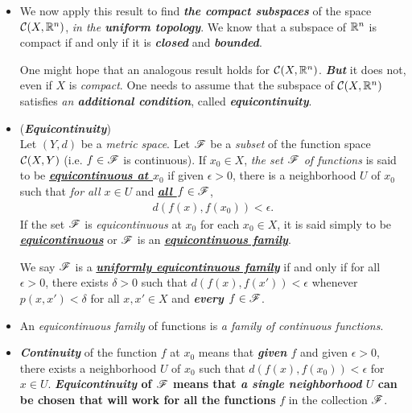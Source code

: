 \documentclass[11pt]{article}
\begin{document}
\begin{itemize}
\item \begin{remark}
We now apply this result to find \emph{\textbf{the compact subspaces}} of the space ${\mathcal C}(X, {\mathbb R}^n)$, \emph{in the \textbf{uniform topology}}. We know that a subspace of ${\mathbb R}^n$ is compact if and only if it is \emph{\textbf{closed}} and \emph{\textbf{bounded}}. 

One might hope that an analogous result holds for ${\mathcal C}(X, {\mathbb R}^n)$. \emph{\textbf{But}} it does not, even if $X$ is \emph{compact}. One needs to assume that the subspace of ${\mathcal C}(X, {\mathbb R}^n)$ satisfies \emph{an \textbf{additional condition}}, called \emph{\textbf{equicontinuity}}. 
\end{remark}

\item \begin{definition}  (\emph{\textbf{Equicontinuity}}) \citep{reed1980methods, munkres2000topology} \\
Let $(Y, d)$ be a \emph{metric space}. Let ${\mathscr F}$ be a \emph{subset} of the function space ${\mathcal C}(X, Y)$ (i.e. $f \in {\mathscr F}$ is continuous). If $x_0 \in X$, \emph{the set ${\mathscr F}$ of functions} is said to be \underline{\emph{\textbf{equicontinuous at $x_0$}}} if given $\epsilon >0$, there is a neighborhood $U$ of $x_0$ such that \emph{for all $x \in U$} and \underline{\emph{\textbf{all $f \in {\mathscr F}$}}},
\begin{align*}
d(f(x), f(x_0)) < \epsilon.
\end{align*}
If the set ${\mathscr F}$ is \emph{equicontinuous} at $x_0$ for each $x_0 \in X$, it is said simply to be \underline{\emph{\textbf{equicontinuous}}} or ${\mathscr F}$ is an \underline{\emph{\textbf{equicontinuous family}}}.

We say ${\mathscr F}$ is a \underline{\emph{\textbf{uniformly equicontinuous family}}} if and only if for all $\epsilon >0$, there exists $\delta > 0$ such that $d(f(x), f(x')) < \epsilon$ whenever $p(x, x') < \delta$ for all $x, x' \in X$ and \emph{\textbf{every $f \in {\mathscr F}$}}.
\end{definition}

\item \begin{remark}
An \emph{equicontinuous family} of functions is \emph{a family of continuous functions}.
\end{remark}

\item \begin{remark}
\emph{\textbf{Continuity}} of the function $f$ at $x_0$ means that \emph{\textbf{given} $f$} and given $\epsilon >0$, there exists a neighborhood $U$ of $x_0$ such that $d(f(x), f(x_0)) < \epsilon$ for $x \in U$. 
\textbf{
\emph{\textbf{Equicontinuity}} of ${\mathscr F}$ means that \emph{\textbf{a single neighborhood}} $U$ can be chosen that will \emph{}work for all the functions} $f$ in the collection ${\mathscr F}$.
\end{remark}


\end{itemize}
\end{document}
